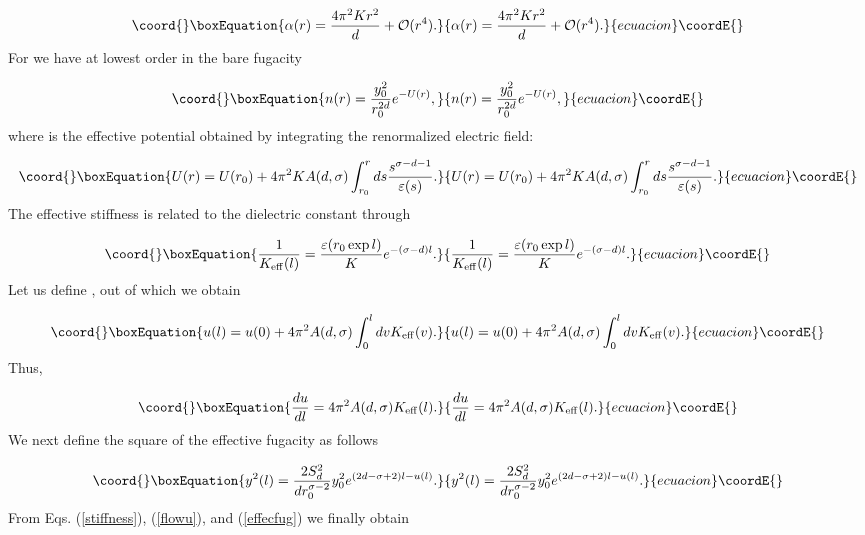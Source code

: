 \documentclass[a4paper,showpacs,preprintnumbers,amsmath,amssymb,prl,twocolumn]{revtex4}
\begin{document}
\begin{equation}\coord{}\boxEquation{
\alpha(r)=\frac{4\pi^2K r^2}{d}+{\cal O}(r^4).
}{
\alpha(r)=\frac{4\pi^2K r^2}{d}+{\cal O}(r^4).
}{ecuacion}\coordE{}\end{equation}
For \coordHE{} we have at lowest order in the bare fugacity \coordHE{}

\begin{equation}\coord{}\boxEquation{
n(r)=\frac{y_0^2}{r_0^{2d}}e^{-U(r)},
}{
n(r)=\frac{y_0^2}{r_0^{2d}}e^{-U(r)},
}{ecuacion}\coordE{}\end{equation}
where \coordHE{} is the effective potential obtained by integrating the 
renormalized electric field:

\begin{equation}\coord{}\boxEquation{
\label{effpot}
U(r)=U(r_0)+4\pi^2
K A(d,\sigma)\int_{r_0}^{r}ds \frac{s^{\sigma-d-1}}{\varepsilon(s)}.
}{
U(r)=U(r_0)+4\pi^2
K A(d,\sigma)\int_{r_0}^{r}ds \frac{s^{\sigma-d-1}}{\varepsilon(s)}.
}{ecuacion}\coordE{}\end{equation}
The effective stiffness \coordHE{} is related to the dielectric constant 
\coordHE{} through

\begin{equation}\coord{}\boxEquation{
\label{stiffness}
\frac{1}{K_{\rm eff}(l)}=\frac{\varepsilon(r_0\exp l)}{K}e^{-(\sigma-d)l}.
}{
\frac{1}{K_{\rm eff}(l)}=\frac{\varepsilon(r_0\exp l)}{K}e^{-(\sigma-d)l}.
}{ecuacion}\coordE{}\end{equation}
Let us define \coordHE{}, out of which we obtain 

\begin{equation}\coord{}\boxEquation{
\label{udel}
u(l)=u(0)+4\pi^2A(d,\sigma)\int_0^l dv K_{\rm eff}(v).
}{
u(l)=u(0)+4\pi^2A(d,\sigma)\int_0^l dv K_{\rm eff}(v).
}{ecuacion}\coordE{}\end{equation}
Thus, 

\begin{equation}\coord{}\boxEquation{
\label{flowu}
\frac{du}{dl}=4\pi^2A(d,\sigma)K_{\rm eff}(l).
}{
\frac{du}{dl}=4\pi^2A(d,\sigma)K_{\rm eff}(l).
}{ecuacion}\coordE{}\end{equation}
We next define the square of the effective fugacity as follows

\begin{equation}\coord{}\boxEquation{
\label{effecfug}
y^2(l)=\frac{2S_d^2}{d r_0^{\sigma-2}}y_0^2 e^{(2d-\sigma+2)l-u(l)}.
}{
y^2(l)=\frac{2S_d^2}{d r_0^{\sigma-2}}y_0^2 e^{(2d-\sigma+2)l-u(l)}.
}{ecuacion}\coordE{}\end{equation}
From Eqs. (\ref{stiffness}), (\ref{flowu}), and (\ref{effecfug})  
we finally obtain
\end{document}
